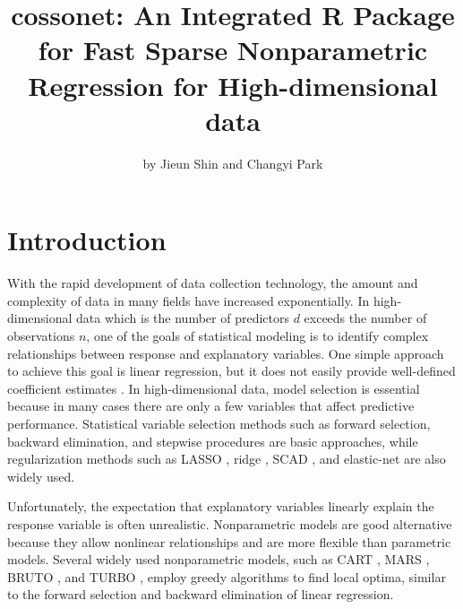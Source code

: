 \title{cossonet: An Integrated R Package for Fast Sparse Nonparametric Regression for High-dimensional data}


\author{by Jieun Shin and Changyi Park}

\maketitle


\hypertarget{sec1}{%
\section{Introduction}\label{sec1}}

With the rapid development of data collection technology, the amount and complexity of data in many fields have increased exponentially. In high-dimensional data which is the number of predictors \(d\) exceeds the number of observations \(n\), one of the goals of statistical modeling is to identify complex relationships between response and explanatory variables. One simple approach to achieve this goal is linear regression, but it does not easily provide well-defined coefficient estimates \citep{Montgomery:2021}. In high-dimensional data, model selection is essential because in many cases there are only a few variables that affect predictive performance. Statistical variable selection methods such as forward selection, backward elimination, and stepwise procedures are basic approaches, while regularization methods such as LASSO \citep{Tibshirani:1996}, ridge \citep{Hoerl:1970}, SCAD \citep{Fan:2001}, and elastic-net \citep{Zou:2005} are also widely used.

Unfortunately, the expectation that explanatory variables linearly explain the response variable is often unrealistic. Nonparametric models are good alternative because they allow nonlinear relationships and are more flexible than parametric models. Several widely used nonparametric models, such as CART \citep{Breiman:1984}, MARS \citep{Friedman:1991}, BRUTO \citep{Hastie:1989}, and TURBO \citep{Friedman:1989}, employ greedy algorithms to find local optima, similar to the forward selection and backward elimination of linear regression.

